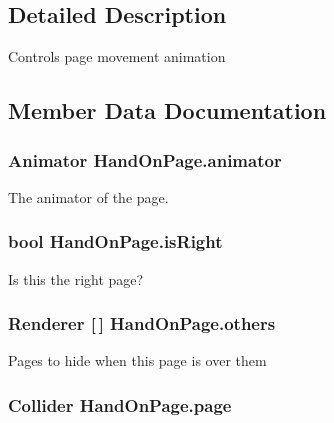\subsection{Detailed Description}
Controls page movement animation 



\subsection{Member Data Documentation}
\subsubsection[{animator}]{\setlength{\rightskip}{0pt plus 5cm}Animator Hand\+On\+Page.\+animator}\label{class_hand_on_page_afd57c043c682cf1a01b36c958db9ed18}


The animator of the page. 

\subsubsection[{is\+Right}]{\setlength{\rightskip}{0pt plus 5cm}bool Hand\+On\+Page.\+is\+Right}\label{class_hand_on_page_aeceb11ff110761c6b8de17f6e3db949a}


Is this the right page? 

\subsubsection[{others}]{\setlength{\rightskip}{0pt plus 5cm}Renderer [$\,$] Hand\+On\+Page.\+others}\label{class_hand_on_page_a8bf4890b1cca8d94dba8b1e1ab3954e6}


Pages to hide when this page is over them 

\subsubsection[{page}]{\setlength{\rightskip}{0pt plus 5cm}Collider Hand\+On\+Page.\+page}\label{class_hand_on_page_a03b366b79c9b970430e0318dd04f98e0}


